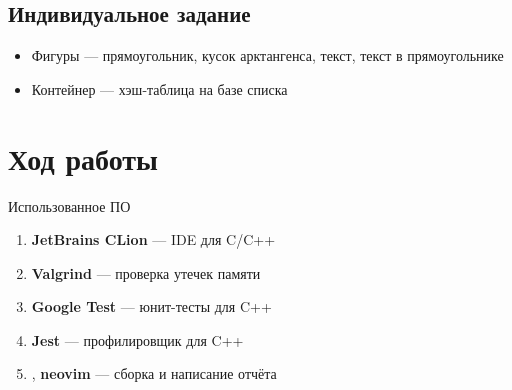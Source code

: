 \documentclass[a4paper, 14pt]{extarticle}
\begin{document}
\subsection{Индивидуальное задание}
\begin{itemize}
    \item Фигуры --- прямоугольник, кусок арктангенса, текст, текст в прямоугольнике
    \item Контейнер --- хэш-таблица на базе списка
\end{itemize}

\section{Ход работы}
Использованное ПО
\begin{enumerate}
    \item \textbf{JetBrains CLion} --- IDE для C/C++
    \item \textbf{Valgrind} --- проверка утечек памяти
    \item \textbf{Google Test} --- юнит-тесты для C++ 
    \item \textbf{Jest} --- профилировщик для C++
    \item \XeLaTeX{}, \textbf{neovim} --- сборка и написание отчёта 
\end{enumerate}
\end{document}
